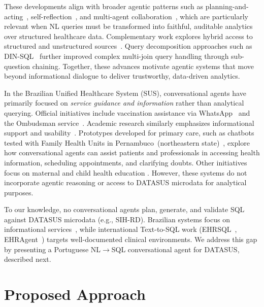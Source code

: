 \documentclass[conference]{IEEEtran}
\begin{document}
These developments align with broader agentic patterns such as planning-and-acting~\cite{react2023}, self-reflection~\cite{reflexion2023}, and multi-agent collaboration~\cite{autogen2023,camel2023}, which are particularly relevant when NL queries must be transformed into faithful, auditable analytics over structured healthcare data. Complementary work explores hybrid access to structured and unstructured sources~\cite{suql2024}. Query decomposition approaches such as DIN-SQL~\cite{pourreza2024din} further improved complex multi-join query handling through sub-question chaining. Together, these advances motivate agentic systems that move beyond informational dialogue to deliver trustworthy, data-driven analytics.

In the Brazilian Unified Healthcare System (SUS), conversational agents have primarily focused on \emph{service guidance and information} rather than analytical querying. Official initiatives include vaccination assistance via WhatsApp~\cite{ms_vax_chatbot_2023} and the Ombudsman service~\cite{ouvsus_chatbot_2024}. Academic research similarly emphasizes informational support and usability~\cite{nascimento2024chatbots,silva2024chatbots}. Prototypes developed for primary care, such as chatbots tested with Family Health Units in Pernambuco~(northeastern state)~\cite{jhi_aps_chatbot_2024}, explore how conversational agents can assist patients and professionals in accessing health information, scheduling appointments, and clarifying doubts. Other initiatives focus on maternal and child health education \cite{xavier2021chatbot}. However, these systems do not incorporate agentic reasoning or access to DATASUS microdata for analytical purposes.

To our knowledge, no conversational agents plan, generate, and validate SQL against DATASUS microdata (e.g., SIH-RD). Brazilian systems focus on informational services~\cite{nascimento2024chatbots,silva2024chatbots}, while international Text-to-SQL work (EHRSQL~\cite{lee2023ehrsql}, EHRAgent~\cite{ehragent2024}) targets well-documented clinical environments. We address this gap by presenting a Portuguese NL$\rightarrow$SQL conversational agent for DATASUS, described next.


\section{Proposed Approach}
\label{sec:approach}
\end{document}

